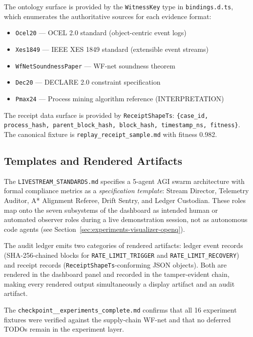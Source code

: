 The ontology surface is provided by the \texttt{WitnessKey} type in \texttt{bindings.d.ts},
which enumerates the authoritative sources for each evidence format:
\begin{itemize}
  \item \texttt{Ocel20} — OCEL 2.0 standard (object-centric event logs)
  \item \texttt{Xes1849} — IEEE XES 1849 standard (extensible event streams)
  \item \texttt{WfNetSoundnessPaper} — WF-net soundness theorem
  \item \texttt{Dec20} — DECLARE 2.0 constraint specification
  \item \texttt{Pmax24} — Process mining algorithm reference (INTERPRETATION)
\end{itemize}

The receipt data surface is provided by \texttt{ReceiptShapeTs}:
\texttt{\{case\_id, process\_hash, parent\_block\_hash, block\_hash, timestamp\_ns, fitness\}}.
The canonical fixture is \texttt{replay\_receipt\_sample.md} with fitness 0.982.

\subsection{Templates and Rendered Artifacts}
\label{sec:experiments-visualizer-impl-templates}

The \texttt{LIVESTREAM\_STANDARDS.md} specifies a 5-agent AGI swarm architecture with formal
compliance metrics as a \emph{specification template}: Stream Director, Telemetry Auditor,
A* Alignment Referee, Drift Sentry, and Ledger Custodian. These roles map onto the seven
subsystems of the dashboard as intended human or automated observer roles during a live
demonstration session, not as autonomous code agents (see Section~\ref{sec:experiments-visualizer-openq}).

The audit ledger emits two categories of rendered artifacts: ledger event records
(SHA-256-chained blocks for \texttt{RATE\_LIMIT\_TRIGGER} and \texttt{RATE\_LIMIT\_RECOVERY})
and receipt records (\texttt{ReceiptShapeTs}-conforming JSON objects). Both are rendered in
the dashboard panel and recorded in the tamper-evident chain, making every rendered output
simultaneously a display artifact and an audit artifact.

The \texttt{checkpoint\_\_experiments\_complete.md} confirms that all 16 experiment fixtures
were verified against the supply-chain WF-net and that no deferred TODOs remain in the
experiment layer.
